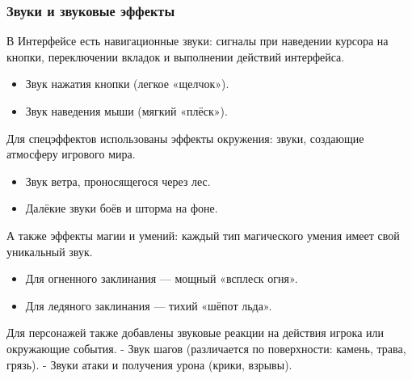 \documentclass{article}
\begin{document}
\subsubsection{Звуки и звуковые эффекты}
В Интерфейсе есть навигационные звуки: 
сигналы при наведении курсора на кнопки, переключении вкладок и выполнении действий интерфейса.
\begin{itemize}
  \item Звук нажатия кнопки (легкое «щелчок»).
  \item Звук наведения мыши (мягкий «плёск»).
\end{itemize}
Для спецэффектов использованы эффекты окружения: 
звуки, создающие атмосферу игрового мира.
\begin{itemize}
    \item Звук ветра, проносящегося через лес.
    \item Далёкие звуки боёв и шторма на фоне.
\end{itemize}
А также эффекты магии и умений: 
каждый тип магического умения имеет свой уникальный звук.
\begin{itemize}
    \item Для огненного заклинания — мощный «всплеск огня».
    \item Для ледяного заклинания — тихий «шёпот льда».
\end{itemize}
Для персонажей также добавлены звуковые реакции на действия игрока или окружающие события.
   - Звук шагов (различается по поверхности: камень, трава, грязь).
   - Звуки атаки и получения урона (крики, взрывы).
   
\end{document}
